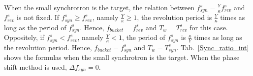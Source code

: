 
When the small synchrotron is the target, the relation between $f_{\mathit{syn}}^{s}=\frac{Y}{\kappa}f_{\mathit{rev}}^{s}$ and $f_{\mathit{rev}}^{s}$ is not fixed. If $f_{\mathit{syn}}^{s}\ge f_{\mathit{rev}}^{s}$, namely $\frac{Y}{\kappa}\ge 1$, the revolution period is $\frac{Y}{\kappa}$ times as long as the period of $f_{\mathit{syn}}^{s}$. Hence, $f_\mathit{bucket}=f_{\mathit{rev}}^{s}$ and $T_w=T_{\mathit{rev}}^{s}$ for this case.
Oppositely,  if $f_{\mathit{syn}}^{s}<f_{\mathit{rev}}^{s}$, namely $\frac{Y}{\kappa}<1$, the period of $f_{\mathit{syn}}^{s}$ is $\frac{\kappa}{Y}$ times as long as the revolution period. Hence, $f_\mathit{bucket}=f_{\mathit{syn}}^{s}$ and $T_w=T_{\mathit{syn}}^{s}$. Tab.~\ref{Sync_ratio_int} shows the formulas when the small synchrotron is the target. When the phase shift method is used, $\Delta f_\mathit{syn}=0$.

